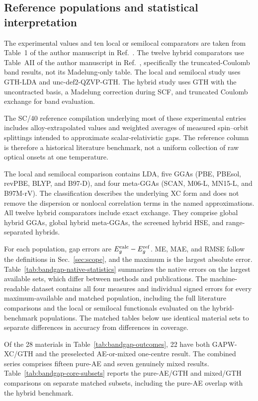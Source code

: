 \documentclass[10pt,a4paper]{article}
\begin{document}
\subsection{Reference populations and statistical interpretation}

The experimental values and ten local or semilocal comparators are taken from Table~1 of the author manuscript in Ref.~. The twelve hybrid comparators use Table~AII of the author manuscript in Ref.~, specifically the truncated-Coulomb band results, not its Madelung-only table. The local and semilocal study uses GTH-LDA and unc-def2-QZVP-GTH. The hybrid study uses GTH with the uncontracted basis, a Madelung correction during SCF, and truncated Coulomb exchange for band evaluation.

The SC/40 reference compilation underlying most of these experimental entries includes alloy-extrapolated values and weighted averages of measured spin--orbit splittings intended to approximate scalar-relativistic gaps.\cite{Heyd2005Gaps} The reference column is therefore a historical literature benchmark, not a uniform collection of raw optical onsets at one temperature.

The local and semilocal comparison contains LDA, five GGAs (PBE, PBEsol, revPBE, BLYP, and B97-D), and four meta-GGAs (SCAN, M06-L, MN15-L, and B97M-rV). The classification describes the underlying XC form and does not remove the dispersion or nonlocal correlation terms in the named approximations. All twelve hybrid comparators include exact exchange. They comprise global hybrid GGAs, global hybrid meta-GGAs, the screened hybrid HSE, and range-separated hybrids.

For each population, gap errors are $E_g^{\rm calc}-E_g^{\rm ref}$. ME, MAE, and RMSE follow the definitions in Sec.~\ref{sec:scope}, and the maximum is the largest absolute error. Table~\ref{tab:bandgap-native-statistics} summarizes the native errors on the largest available sets, which differ between methods and publications. The machine-readable dataset contains all four measures and individual signed errors for every maximum-available and matched population, including the full literature comparisons and the local or semilocal functionals evaluated on the hybrid-benchmark populations. The matched tables below use identical material sets to separate differences in accuracy from differences in coverage.

Of the 28 materials in Table~\ref{tab:bandgap-outcomes}, 22 have both GAPW-XC/GTH and the preselected AE-or-mixed one-centre result. The combined series comprises fifteen pure-AE and seven genuinely mixed results. Table~\ref{tab:bandgap-core-subsets} reports the pure-AE/GTH and mixed/GTH comparisons on separate matched subsets, including the pure-AE overlap with the hybrid benchmark.
\end{document}

